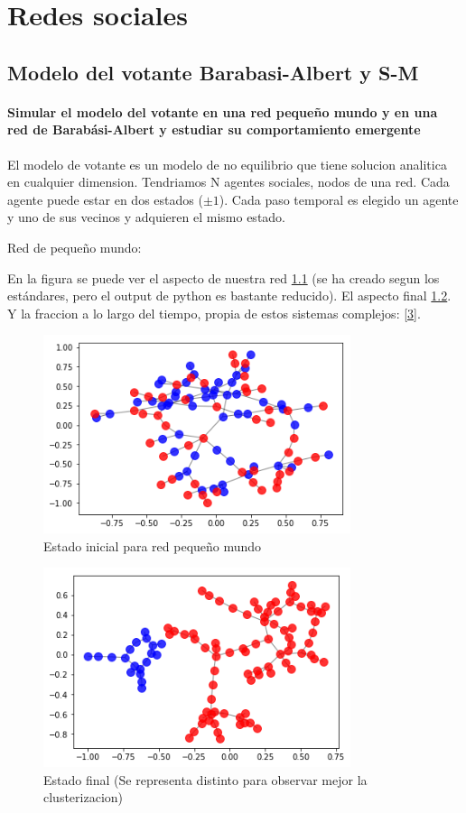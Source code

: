 \chapter{Redes sociales}

\section{Modelo del votante Barabasi-Albert y S-M}

\subsubsection{\large Simular el modelo del votante en una red pequeño mundo y en una red de Barabási-Albert y estudiar su comportamiento emergente} 
El modelo de votante es un modelo de no equilibrio que tiene solucion analitica en cualquier dimension. Tendriamos N agentes sociales, nodos de una red. Cada agente puede estar en dos estados ($\pm1$). Cada paso temporal es elegido un agente y uno de sus vecinos y adquieren el mismo estado.

Red de pequeño mundo:

En la figura se puede ver el aspecto de nuestra red \ref{1} (se ha creado segun los estándares, pero el output de python es bastante reducido). El aspecto final \ref{2}. Y la fraccion a lo largo del tiempo, propia de estos sistemas complejos: \ref{3}.
\begin{figure}
	\centering
	\includegraphics[width=9cm]{dist_inic_small}
	\caption{Estado inicial para red pequeño mundo}
	\label{1}
\end{figure}

\begin{figure}
	\centering
	\includegraphics[width=9cm]{final_small}
	\caption{Estado final (Se representa distinto para observar mejor la clusterizacion)}
	\label{2}
\end{figure}


